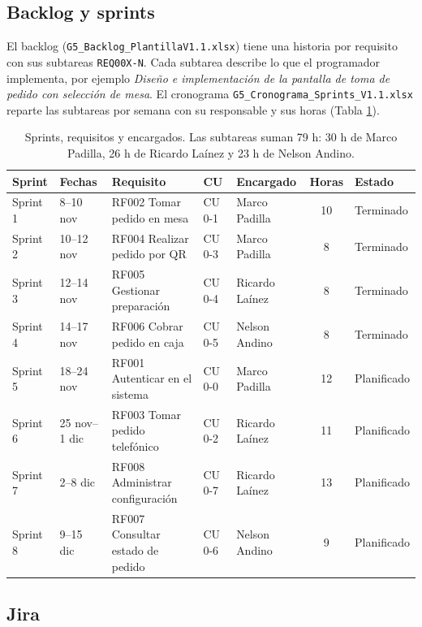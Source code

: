 \documentclass[a4paper, 11pt]{article}
\begin{document}
\subsection{Backlog y sprints}

El backlog (\texttt{G5\_Backlog\_PlantillaV1.1.xlsx}) tiene una historia por requisito con sus subtareas \texttt{REQ00X-N}. Cada subtarea describe lo que el programador implementa, por ejemplo \textit{Diseño e implementación de la pantalla de toma de pedido con selección de mesa}. El cronograma \texttt{G5\_Cronograma\_Sprints\_V1.1.xlsx} reparte las subtareas por semana con su responsable y sus horas (Tabla \ref{tab:sprints}).

\begin{table}[H]
\centering
\footnotesize
\begin{tabular}{|l|l|l|l|l|c|l|}
\hline
\textbf{Sprint} & \textbf{Fechas} & \textbf{Requisito} & \textbf{CU} & \textbf{Encargado} & \textbf{Horas} & \textbf{Estado} \\ \hline
Sprint 1 & 8--10 nov & RF002 Tomar pedido en mesa & CU 0-1 & Marco Padilla & 10 & Terminado \\ \hline
Sprint 2 & 10--12 nov & RF004 Realizar pedido por QR & CU 0-3 & Marco Padilla & 8 & Terminado \\ \hline
Sprint 3 & 12--14 nov & RF005 Gestionar preparación & CU 0-4 & Ricardo Laínez & 8 & Terminado \\ \hline
Sprint 4 & 14--17 nov & RF006 Cobrar pedido en caja & CU 0-5 & Nelson Andino & 8 & Terminado \\ \hline
Sprint 5 & 18--24 nov & RF001 Autenticar en el sistema & CU 0-0 & Marco Padilla & 12 & Planificado \\ \hline
Sprint 6 & 25 nov--1 dic & RF003 Tomar pedido telefónico & CU 0-2 & Ricardo Laínez & 11 & Planificado \\ \hline
Sprint 7 & 2--8 dic & RF008 Administrar configuración & CU 0-7 & Ricardo Laínez & 13 & Planificado \\ \hline
Sprint 8 & 9--15 dic & RF007 Consultar estado de pedido & CU 0-6 & Nelson Andino & 9 & Planificado \\ \hline
\end{tabular}
\caption{Sprints, requisitos y encargados. Las subtareas suman 79 h: 30 h de Marco Padilla, 26 h de Ricardo Laínez y 23 h de Nelson Andino.}
\label{tab:sprints}
\end{table}

\subsection{Jira}
\end{document}
